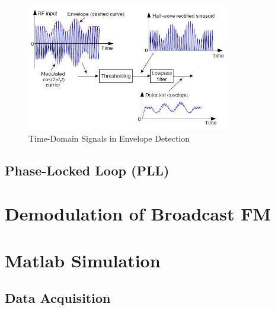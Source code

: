\documentclass[conference]{IEEEtran}
\begin{document}

    \begin{figure}[!h]
      \centering
        \includegraphics[width=8.8cm]{img/envelope-detect-time-domain.jpg}
      \caption{Time-Domain Signals in Envelope Detection \cite{ref_time_domain_envelope_detect}}
      \label{fig_time_domain_envelope_detect}
    \end{figure}



  \subsection{Phase-Locked Loop (PLL)}

\section{Demodulation of Broadcast FM}



\section{Matlab Simulation}

  \subsection{Data Acquisition}
\end{document}
